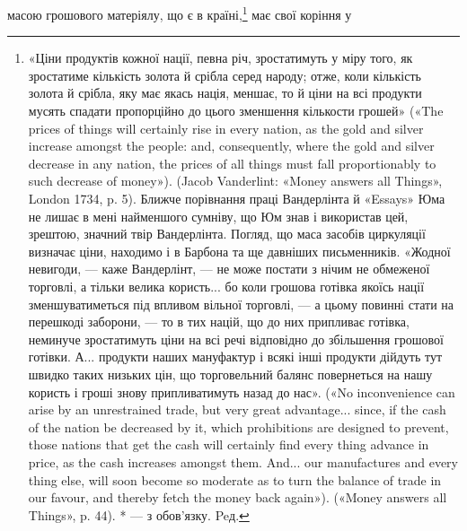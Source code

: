 масою грошового матеріялу, що є в країні,\footnote{
«Ціни продуктів кожної нації, певна річ, зростатимуть у міру
того, як зростатиме кількість золота й срібла серед народу; отже, коли
кількість золота й срібла, яку має якась нація, меншає, то й ціни на всі
продукти мусять спадати пропорційно до цього зменшення кількости грошей»
(«The prices of things will certainly rise in every nation, as the gold
and silver increase amongst the people: and, consequently, where the gold
and silver decrease in any nation, the prices of all things must fall proportionably
to such decrease of money»). (Jacob Vanderlint: «Money answers
all Things», London 1734, p. 5). Ближче порівнання праці Вандерлінта
й «Essays» Юма не лишає в мені найменшого сумніву, що Юм
знав і використав цей, зрештою, значний твір Вандерлінта. Погляд, що
маса засобів циркуляції визначає ціни, находимо і в Барбона та ще давніших
письменників. «Жодної невигоди, — каже Вандерлінт, — не може
постати з нічим не обмеженої торговлі, а тільки велика користь... бо коли
грошова готівка якоїсь нації зменшуватиметься під впливом вільної
торговлі, — а цьому повинні стати на перешкоді заборони, — то в тих націй,
що до них припливає готівка, неминуче зростатимуть ціни на всі
речі відповідно до збільшення грошової готівки. А... продукти наших мануфактур
і всякі інші продукти дійдуть тут швидко таких низьких цін,
що торговельний балянс повернеться на нашу користь і гроші знову припливатимуть
назад до нас». («No inconvenience can arise by an unrestrained
trade, but very great advantage... since, if the cash of the nation be decreased
by it, which prohibitions are designed to prevent, those nations that
get the cash will certainly find every thing advance in price, as the cash
increases amongst them. And... our manufactures and every thing else, will
soon become so moderate as to turn the balance of trade in our favour, and thereby
fetch the money back again»). («Money answers all Things», p. 44).
* — з обов’язку. Peд.
} має свої коріння у

